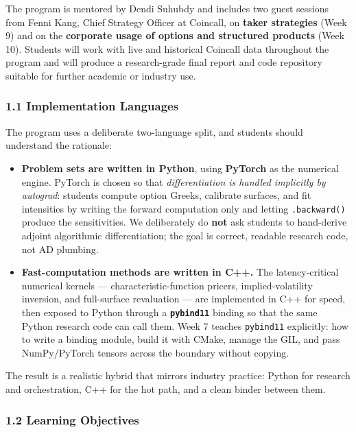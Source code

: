 \documentclass[
]{article}
\begin{document}
The program is mentored by Dendi Suhubdy and includes two guest sessions
from Fenni Kang, Chief Strategy Officer at Coincall, on \textbf{taker
strategies} (Week 9) and on the \textbf{corporate usage of options and
structured products} (Week 10). Students will work with live and
historical Coincall data throughout the program and will produce a
research-grade final report and code repository suitable for further
academic or industry use.

\subsubsection{1.1 Implementation
Languages}\label{implementation-languages}

The program uses a deliberate two-language split, and students should
understand the rationale:

\begin{itemize}
\item
  \textbf{Problem sets are written in Python}, using \textbf{PyTorch} as
  the numerical engine. PyTorch is chosen so that \emph{differentiation
  is handled implicitly by autograd}: students compute option Greeks,
  calibrate surfaces, and fit intensities by writing the forward
  computation only and letting \texttt{.backward()} produce the
  sensitivities. We deliberately do \textbf{not} ask students to
  hand-derive adjoint algorithmic differentiation; the goal is correct,
  readable research code, not AD plumbing.
\item
  \textbf{Fast-computation methods are written in C++.} The
  latency-critical numerical kernels --- characteristic-function
  pricers, implied-volatility inversion, and full-surface revaluation
  --- are implemented in C++ for speed, then exposed to Python through a
  \textbf{\texttt{pybind11}} binding so that the same Python research
  code can call them. Week 7 teaches \texttt{pybind11} explicitly: how
  to write a binding module, build it with CMake, manage the GIL, and
  pass NumPy/PyTorch tensors across the boundary without copying.
\end{itemize}

The result is a realistic hybrid that mirrors industry practice: Python
for research and orchestration, C++ for the hot path, and a clean binder
between them.

\subsubsection{1.2 Learning Objectives}\label{learning-objectives}
\end{document}
